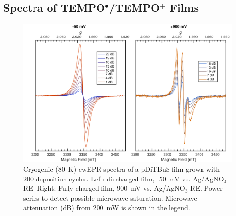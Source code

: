 \subsection{Spectra of TEMPO$^{\bullet}$/TEMPO$^{+}$ Films}
\begin{figure}[h]
\center
	\includegraphics[width=1\textwidth]{./operando_epr/figures/CRYO/S220104_CW.pdf}
	\caption{Cryogenic (80~K) cwEPR spectra of a pDiTBuS film grown with 200 deposition cycles. Left: discharged film, -50~mV vs. Ag/AgNO$_3$ RE. Right: Fully charged film, 900~mV vs. Ag/AgNO$_3$ RE. Power series to detect possible microwave saturation. Microwave attenuation (dB) from 200~mW is shown in the legend.}
	\label{fig:cwEPR_CRYO_DiTBuS_DCG_vs_CHG}
\end{figure}
